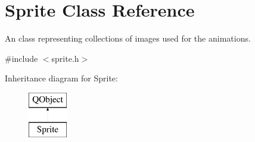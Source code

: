 \hypertarget{class_sprite}{}\section{Sprite Class Reference}
\label{class_sprite}


An class representing collections of images used for the animations.  




{\ttfamily \#include $<$sprite.\+h$>$}

Inheritance diagram for Sprite\+:\begin{figure}[H]
\begin{center}
\leavevmode
\includegraphics[height=2.000000cm]{class_sprite}
\end{center}
\end{figure}
